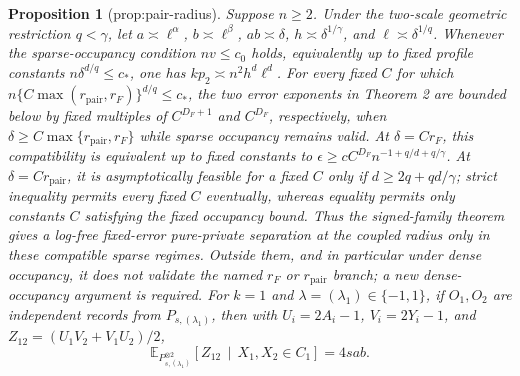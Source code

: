\documentclass{article}
\newtheorem{proposition}{Proposition}
\begin{document}
\begin{proposition}[prop:pair-radius]\label{prop:pair-radius}
Suppose \(n\ge2\). Under the two-scale geometric restriction \(q<\gamma\), let \(a\asymp\ell^\alpha\), \(b\asymp\ell^\beta\), \(ab\asymp\delta\), \(h\asymp\delta^{1/\gamma}\), and \(\ell\asymp\delta^{1/q}\). Whenever the sparse-occupancy condition \(nv\le c_0\) holds, equivalently up to fixed profile constants \(n\delta^{d/q}\le c_*\), one has \(kp_2\asymp n^2h^d\ell^d\). For every fixed \(C\) for which \(n\{C\max(r_{\mathrm{pair}},r_F)\}^{d/q}\le c_*\), the two error exponents in Theorem 2 are bounded below by fixed multiples of \(C^{D_F+1}\) and \(C^{D_F}\), respectively, when \(\delta\ge C\max\{r_{\mathrm{pair}},r_F\}\) while sparse occupancy remains valid. At \(\delta=Cr_F\), this compatibility is equivalent up to fixed constants to \(\epsilon\ge cC^{D_F}n^{-1+q/d+q/\gamma}\). At \(\delta=Cr_{\mathrm{pair}}\), it is asymptotically feasible for a fixed \(C\) only if \(d\ge2q+qd/\gamma\); strict inequality permits every fixed \(C\) eventually, whereas equality permits only constants \(C\) satisfying the fixed occupancy bound. Thus the signed-family theorem gives a log-free fixed-error pure-private separation at the coupled radius only in these compatible sparse regimes. Outside them, and in particular under dense occupancy, it does not validate the named \(r_F\) or \(r_{\mathrm{pair}}\) branch; a new dense-occupancy argument is required. For \(k=1\) and \(\lambda=(\lambda_1)\in\{-1,1\}\), if \(O_1,O_2\) are independent records from \(P_{s,(\lambda_1)}\), then with \(U_i=2A_i-1\), \(V_i=2Y_i-1\), and \(Z_{12}=(U_1V_2+V_1U_2)/2\),
\[
 \mathbb E_{P_{s,(\lambda_1)}^{\otimes2}}
 \!\left[Z_{12}\,\middle|\,X_1,X_2\in C_1\right]=4sab.
\]
\end{proposition}
\end{document}
